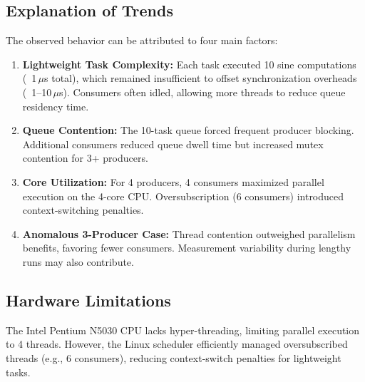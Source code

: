\documentclass{article}
\begin{document}
\subsection{Explanation of Trends}
The observed behavior can be attributed to four main factors:
\begin{enumerate}
    \item \textbf{Lightweight Task Complexity:} Each task executed 10 sine computations (~1\,$\mu$s total), which remained insufficient to offset synchronization overheads (~1--10\,$\mu$s). Consumers often idled, allowing more threads to reduce queue residency time.
    
    \item \textbf{Queue Contention:} The 10-task queue forced frequent producer blocking. Additional consumers reduced queue dwell time but increased mutex contention for 3+ producers.
    
    \item \textbf{Core Utilization:} For 4 producers, 4 consumers maximized parallel execution on the 4-core CPU. Oversubscription (6 consumers) introduced context-switching penalties.
    
    \item \textbf{Anomalous 3-Producer Case:} Thread contention outweighed parallelism benefits, favoring fewer consumers. Measurement variability during lengthy runs may also contribute.
\end{enumerate}

\subsection{Hardware Limitations}
The Intel Pentium N5030 CPU lacks hyper-threading, limiting parallel execution to 4 threads. However, the Linux scheduler efficiently managed oversubscribed threads (e.g., 6 consumers), reducing context-switch penalties for lightweight tasks.
\end{document}

